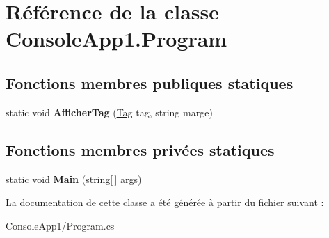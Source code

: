 \hypertarget{class_console_app1_1_1_program}{}\section{Référence de la classe Console\+App1.\+Program}
\label{class_console_app1_1_1_program}
\subsection*{Fonctions membres publiques statiques}
\begin{DoxyCompactItemize}
\item 
\mbox{\label{class_console_app1_1_1_program_abeb3482b7b0fd239052d4a5299d3831e}} 
static void {\bfseries Afficher\+Tag} (\mbox{\hyperlink{class_m_t_connect_agent_1_1_model_1_1_tag}{Tag}} tag, string marge)
\end{DoxyCompactItemize}
\subsection*{Fonctions membres privées statiques}
\begin{DoxyCompactItemize}
\item 
\mbox{\label{class_console_app1_1_1_program_ae6cedb55c6b52f4193827df8c1cf88cc}} 
static void {\bfseries Main} (string\mbox{[}$\,$\mbox{]} args)
\end{DoxyCompactItemize}


La documentation de cette classe a été générée à partir du fichier suivant \+:\begin{DoxyCompactItemize}
\item 
Console\+App1/Program.\+cs\end{DoxyCompactItemize}
